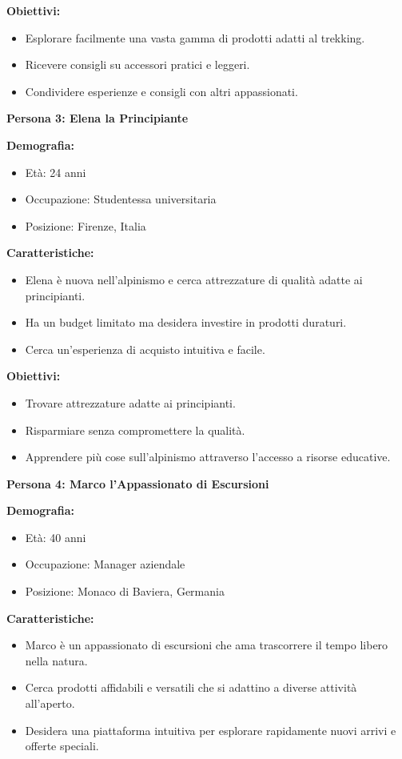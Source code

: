 \textbf{Obiettivi:}
\begin{itemize}
    \item Esplorare facilmente una vasta gamma di prodotti adatti al trekking.
    \item Ricevere consigli su accessori pratici e leggeri.
    \item Condividere esperienze e consigli con altri appassionati.

\end{itemize}

\textbf{Persona 3: Elena la Principiante}

\textbf{Demografia:}
\begin{itemize}
    \item Età: 24 anni
    \item Occupazione: Studentessa universitaria
    \item Posizione: Firenze, Italia
\end{itemize}

\textbf{Caratteristiche:}
\begin{itemize}
    \item Elena è nuova nell'alpinismo e cerca attrezzature di qualità adatte ai principianti.
    \item Ha un budget limitato ma desidera investire in prodotti duraturi.
    \item Cerca un'esperienza di acquisto intuitiva e facile.
\end{itemize}

\textbf{Obiettivi:}
\begin{itemize}
    \item Trovare attrezzature adatte ai principianti.
    \item Risparmiare senza compromettere la qualità.
    \item Apprendere più cose sull'alpinismo attraverso l'accesso a risorse educative.

\end{itemize}

\textbf{Persona 4: Marco l'Appassionato di Escursioni}

\textbf{Demografia:}
\begin{itemize}
    \item Età: 40 anni
    \item Occupazione: Manager aziendale
    \item Posizione: Monaco di Baviera, Germania
\end{itemize}

\textbf{Caratteristiche:}
\begin{itemize}
    \item Marco è un appassionato di escursioni che ama trascorrere il tempo libero nella natura.
    \item Cerca prodotti affidabili e versatili che si adattino a diverse attività all'aperto.
    \item Desidera una piattaforma intuitiva per esplorare rapidamente nuovi arrivi e offerte speciali.
\end{itemize}

